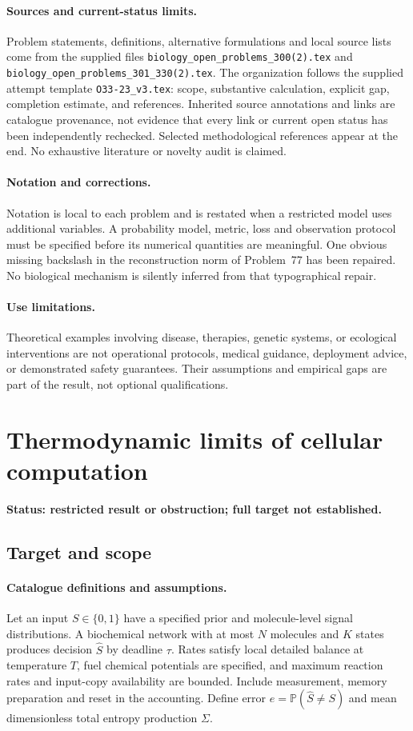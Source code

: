 \documentclass[11pt]{article}
\begin{document}
\paragraph{Sources and current-status limits.}
Problem statements, definitions, alternative formulations and local source lists
come from the supplied files
\texttt{biology\_open\_problems\_300(2).tex} and
\texttt{biology\_open\_problems\_301\_330(2).tex}.
The organization follows the supplied attempt template
\texttt{O33-23\_v3.tex}: scope, substantive calculation, explicit gap,
completion estimate, and references. Inherited source annotations and links are
catalogue provenance, not evidence that every link or current open status has
been independently rechecked. Selected methodological references appear at the
end. No exhaustive literature or novelty audit is claimed.

\paragraph{Notation and corrections.}
Notation is local to each problem and is restated when a restricted model uses
additional variables. A probability model, metric, loss and observation protocol
must be specified before its numerical quantities are meaningful. One obvious
missing backslash in the reconstruction norm of Problem~77 has been repaired.
No biological mechanism is silently inferred from that typographical repair.

\paragraph{Use limitations.}
Theoretical examples involving disease, therapies, genetic systems, or ecological
interventions are not operational protocols, medical guidance, deployment advice,
or demonstrated safety guarantees. Their assumptions and empirical gaps are part
of the result, not optional qualifications.


\section*{Thermodynamic limits of cellular computation}
\label{prob:100}
\noindent\textbf{Status: restricted result or obstruction; full target not established.}
\subsection{Target and scope}
\paragraph{Catalogue definitions and assumptions.}
Let an input $S\in\{0,1\}$ have a specified prior and molecule-level signal distributions. A biochemical network with at most $N$ molecules and $K$ states produces decision $\widehat S$ by deadline $\tau$. Rates satisfy local detailed balance at temperature $T$, fuel chemical potentials are specified, and maximum reaction rates and input-copy availability are bounded. Include measurement, memory preparation and reset in the accounting. Define error $e=\mathbb{P}(\widehat S\ne S)$ and mean dimensionless total entropy production $\Sigma$.
\end{document}
